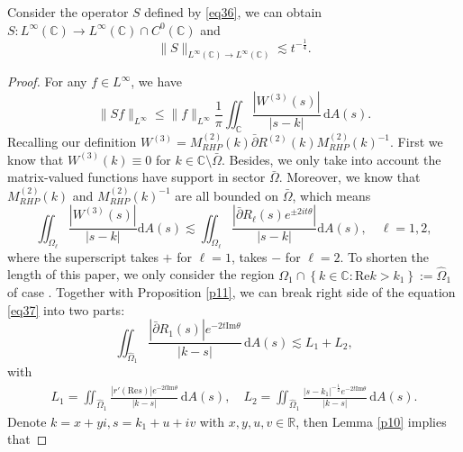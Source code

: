 \documentclass[10pt,a4paper]{amsart}
\begin{document}
\begin{Proposition}\label{p17}
    Consider the operator $S$ defined by \eqref{eq36},  we can obtain $S : L^\infty(\mathbb{C}) \to L^\infty(\mathbb{C}) \cap C^0(\mathbb{C})$ and
\begin{equation}
    \|S\|_{L^\infty(\mathbb{C}) \to L^\infty(\mathbb{C})} \lesssim t^{-\frac{1}{4}}.
\end{equation}

\end{Proposition}

\begin{proof}
    For any $f \in L^\infty$, we have
\begin{equation*}
    \|Sf\|_{L^\infty} \leq \|f\|_{L^\infty} \frac{1}{\pi} \iint_\mathbb{C} \frac{|W^{(3)}(s)|}{|s - k|} \, \mathrm{d}A(s).
\end{equation*}
Recalling our definition $W^{(3)} =  M_{RHP}^{(2)}(k) \bar{\partial} R^{(2)}(k) M_{RHP}^{(2)}(k)^{-1}.$ First we know that $W^{(3)}(k) \equiv 0$ for $k \in \mathbb{C} \setminus \bar{\Omega}$. Besides, we only take into account the matrix-valued functions have support in sector $\bar{\Omega}$. Moreover, we know that $M_{RHP}^{(2)}(k)$ and $M_{RHP}^{(2)}(k)^{-1}$ are all bounded on $\bar{\Omega}$, which means
\begin{equation}\label{eq37}
    \iint_{\Omega_\ell}\frac{|W^{(3)}(s)|}{|s-k|}\mathrm{d}A(s)\lesssim\iint_{\Omega_\ell}\frac{|\bar{\partial}R_\ell(s)e^{\pm2it\theta}|}{|s-k|}\mathrm{d}A(s),\quad\ell=1,2,
\end{equation}
where the superscript takes $+$ for $\ell=1$, takes $-$ for $\ell=2$.
To shorten the length of this paper, we only consider the region $\Omega_1\cap\left\{k\in\mathbb{C}:\mathrm{Re}k>k_1\right\}:=\widehat\Omega_1$ of case \uppercase\expandafter{}. Together with Proposition \ref{p11}, we can break right side of the equation \eqref{eq37} into two parts:
\begin{equation*}
\iint_{\widehat\Omega_1} \frac{|\bar{\partial} R_{1}(s)| e^{-2t \mathrm{Im} \theta}}{|k - s|} \, \mathrm{d}A(s)
\lesssim L_1 + L_2,
\end{equation*}
with
\begin{align*}
    L_1 = \iint_{\widehat\Omega_1} \frac{|r'(\mathrm{Re}s)| e^{-2t \mathrm{Im} \theta}}{|k - s|} \, \mathrm{d}A(s),\quad L_2 = \iint_{\widehat\Omega_1} \frac{|s - k_1|^{-\frac{1}{2}} e^{-2t \mathrm{Im} \theta}}{|k - s|} \, \mathrm{d}A(s).
\end{align*}
Denote $k=x+yi,s=k_1+u+iv$ with $x,y,u,v\in\mathbb{R}$, then Lemma \ref{p10} implies that

\end{proof}
\end{document}
